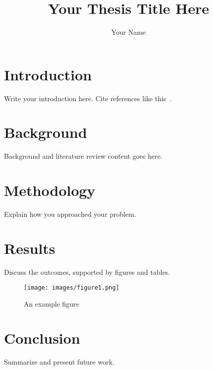 \documentclass[sigconf, screen, review=false, nonacm]{acmart}
\title{Your Thesis Title Here}
\author{Your Name}
\affiliation{
  \institution{Your University}
  \city{City}
  \country{Country}
}
\begin{document}
\maketitle

\section{Introduction}
Write your introduction here. Cite references like this~\cite{lamport1994latex}.

\section{Background}
Background and literature review content goes here.

\section{Methodology}
Explain how you approached your problem.

\section{Results}
Discuss the outcomes, supported by figures and tables.

\begin{figure}[h]
  \centering
  \texttt{[image: images/figure1.png]}
  \caption{An example figure}
  \label{fig:example}
\end{figure}

\section{Conclusion}
Summarize and present future work.



\end{document}
